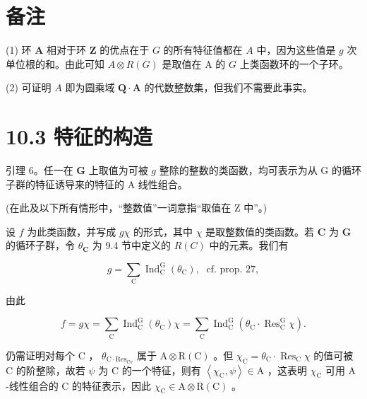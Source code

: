 \documentclass[10pt]{article}
\begin{document}
\section*{备注}

(1) 环 \(\mathbf{A}\) 相对于环 \(\mathbf{Z}\) 的优点在于 \(G\) 的所有特征值都在 \(A\) 中，因为这些值是 \(g\) 次单位根的和。由此可知 \(A \otimes  R\left( G\right)\) 是取值在 A 的 \(G\) 上类函数环的一个子环。

(2) 可证明 \(A\) 即为圆乘域 \(\mathbf{Q} \cdot  \mathbf{A}\) 的代数整数集，但我们不需要此事实。

\section*{10.3 特征的构造}

引理 6。任一在 \(\mathbf{G}\) 上取值为可被 \(g\) 整除的整数的类函数，均可表示为从 \(\mathrm{G}\) 的循环子群的特征诱导来的特征的 A 线性组合。

(在此及以下所有情形中，“整数值”一词意指“取值在 Z 中”。)

设 \(f\) 为此类函数，并写成 \({g\chi }\) 的形式，其中 \(\chi\) 是取整数值的类函数。若 \(\mathbf{C}\) 为 \(\mathbf{G}\) 的循环子群，令 \({\theta }_{\mathbf{C}}\) 为 9.4 节中定义的 \(R\left( C\right)\) 中的元素。我们有

\[
g = \mathop{\sum }\limits_{\mathrm{C}}{\operatorname{Ind}}_{\mathrm{C}}^{\mathrm{G}}\left( {\theta }_{\mathrm{C}}\right) ,\;\text{ cf. prop. }{27},
\]

由此

\[
f = {g\chi } = \mathop{\sum }\limits_{\mathrm{C}}{\operatorname{Ind}}_{\mathrm{C}}^{\mathrm{G}}\left( {\theta }_{\mathrm{C}}\right) \chi  = \mathop{\sum }\limits_{\mathrm{C}}{\operatorname{Ind}}_{\mathrm{C}}^{\mathrm{G}}\left( {{\theta }_{\mathrm{C}} \cdot  {\operatorname{Res}}_{\mathrm{C}}^{\mathrm{G}}\chi }\right) .
\]

仍需证明对每个 \(\mathrm{C}\) ， \({\theta }_{\mathrm{C} \cdot  {\mathrm{{Res}}}_{\mathrm{{Cv}}}}\) 属于 \(\mathrm{A} \otimes  \mathrm{R}\left( \mathrm{C}\right)\) 。但 \({\chi }_{\mathrm{C}} = {\theta }_{\mathrm{C}} \cdot  {\operatorname{Res}}_{\mathrm{C}}\chi\) 的值可被 \(\mathrm{C}\) 的阶整除，故若 \(\psi\) 为 \(\mathrm{C}\) 的一个特征，则有 \(\left\langle  {{\chi }_{\mathrm{C}},\psi }\right\rangle   \in  \mathrm{A}\) ，这表明 \({\chi }_{\mathrm{C}}\) 可用 \(\mathrm{A}\) -线性组合的 \(\mathrm{C}\) 的特征表示，因此 \({\chi }_{\mathrm{C}} \in  \mathrm{A} \otimes  \mathrm{R}\left( \mathrm{C}\right)\) 。
\end{document}
